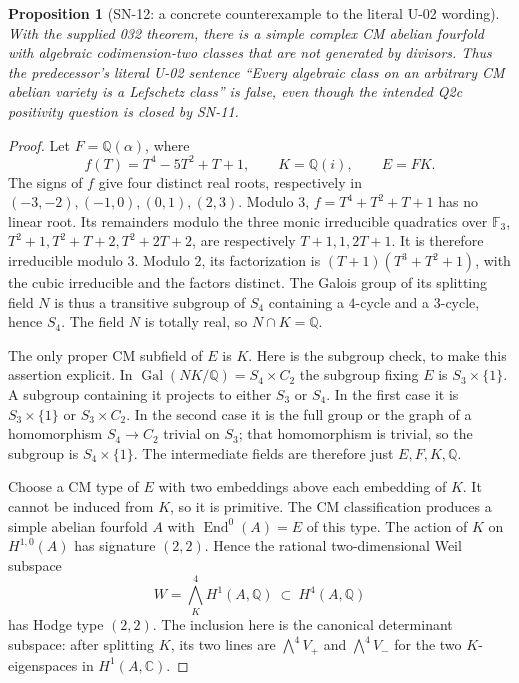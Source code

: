 \documentclass[11pt,a4paper]{article}
\newtheorem{proposition}[theorem]{Proposition}
\theoremstyle{definition}
\theoremstyle{remark}
\begin{document}
\begin{proposition}[SN-12: a concrete counterexample to the literal U-02 wording]
With the supplied 032 theorem, there is a simple complex CM abelian
fourfold with algebraic codimension-two classes that are not generated by
divisors.  Thus the predecessor's literal U-02 sentence
``Every algebraic class on an arbitrary CM abelian variety is a Lefschetz
class'' is false, even though the intended Q2c positivity question is
closed by SN-11.
\end{proposition}
\begin{proof}
Let $F=\mathbb Q(\alpha)$, where
\[
 f(T)=T^4-5T^2+T+1,\qquad K=\mathbb Q(i),\qquad E=FK.
\]
The signs of $f$ give four distinct real roots, respectively in
$(-3,-2),(-1,0),(0,1),(2,3)$.
Modulo $3$, $f=T^4+T^2+T+1$ has no linear root.  Its remainders modulo the
three monic irreducible quadratics over $\mathbb F_3$,
$T^2+1,T^2+T+2,T^2+2T+2$, are respectively
$T+1,1,2T+1$.  It is therefore irreducible modulo $3$.
Modulo $2$, its factorization is
$(T+1)(T^3+T^2+1)$, with the cubic irreducible and the factors distinct.
The Galois group of its splitting field $N$ is thus a transitive subgroup
of $S_4$ containing a $4$-cycle and a $3$-cycle, hence $S_4$.
The field $N$ is totally real, so $N\cap K=\mathbb Q$.

The only proper CM subfield of $E$ is $K$.  Here is the subgroup check,
to make this assertion explicit.  In
$\operatorname{Gal}(NK/\mathbb Q)=S_4\times C_2$ the subgroup fixing $E$
is $S_3\times\{1\}$.  A subgroup containing it projects to either $S_3$
or $S_4$.  In the first case it is $S_3\times\{1\}$ or $S_3\times C_2$.
In the second case it is the full group or the graph of a homomorphism
$S_4\to C_2$ trivial on $S_3$; that homomorphism is trivial, so the subgroup
is $S_4\times\{1\}$.  The intermediate fields are therefore just
$E,F,K,\mathbb Q$.

Choose a CM type of $E$ with two embeddings above each embedding of $K$.
It cannot be induced from $K$, so it is primitive.  The CM classification
\cite[Propositions~3.12--3.13]{MilneCM} produces a simple abelian fourfold
$A$ with $\operatorname{End}^0(A)=E$ of this type.  The action of $K$ on
$H^{1,0}(A)$ has signature $(2,2)$.  Hence the rational two-dimensional
Weil subspace
\[
 W=\bigwedge_K^4 H^1(A,\mathbb Q)\ \subset\ H^4(A,\mathbb Q)
\]
has Hodge type $(2,2)$.  The inclusion here is the canonical determinant
subspace: after splitting $K$, its two lines are
$\bigwedge^4 V_+$ and $\bigwedge^4 V_-$ for the two $K$-eigenspaces in
$H^1(A,\mathbb C)$.


\end{proof}
\end{document}
